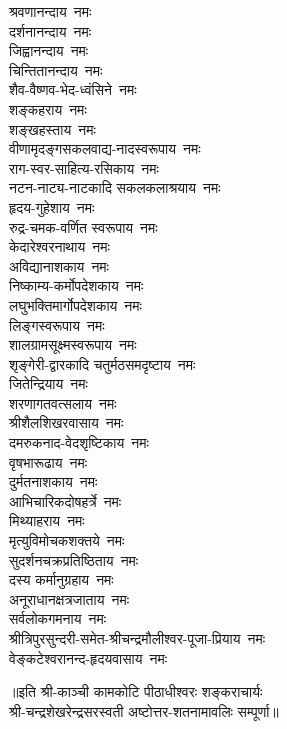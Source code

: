 \begin{flushleft}
\begin{multicols}{2}
श्रवणानन्दाय~नमः\\
दर्शनानन्दाय~नमः\\
जिह्वानन्दाय~नमः\\
चिन्तितानन्दाय~नमः\\
शैव-वैष्णव-भेद-ध्वंसिने~नमः\\
शङ्कहराय~नमः\hfill{}\\
शङ्खहस्ताय~नमः\\
वीणामृदङ्गसकलवाद्य-नादस्वरूपाय~नमः\\
राग-स्वर-साहित्य-रसिकाय~नमः\\
नटन-नाट्य-नाटकादि सकलकलाश्रयाय~नमः\\
हृदय-गुहेशाय~नमः\\
रुद्र-चमक-वर्णित स्वरूपाय~नमः\\
केदारेश्वरनाथाय~नमः\\
अविद्यानाशकाय~नमः\\
निष्काम्य-कर्मोपदेशकाय~नमः\\
लघुभक्तिमार्गोपदेशकाय~नमः\hfill{}\\
लिङ्गस्वरूपाय~नमः\\
शालग्रामसूक्ष्मस्वरूपाय~नमः\\
शृङ्गेरी-द्वारकादि चतुर्मठसमदृष्टाय~नमः\\
जितेन्द्रियाय~नमः\\
शरणागतवत्सलाय~नमः\\
श्रीशैलशिखरवासाय~नमः\\
दमरुकनाद-वेदशृष्टिकाय~नमः\\
वृषभारूढाय~नमः\\
दुर्मतनाशकाय~नमः\\
आभिचारिकदोषहर्त्रे~नमः\hfill{}\\
मिथ्याहराय~नमः\\
मृत्युविमोचकशक्तये~नमः\\
सुदर्शनचक्रप्रतिष्ठिताय~नमः\\
दस्य कर्मानुग्रहाय~नमः\\
अनूराधानक्षत्रजाताय~नमः\\
सर्वलोकगमनाय~नमः\\
श्रीत्रिपुरसुन्दरी-समेत-श्रीचन्द्रमौलीश्वर-पूजा-प्रियाय~नमः\\
वेङ्कटेश्वरानन्द-हृदयवासाय~नमः\\
\end{multicols}
\end{flushleft}
॥इति श्री-काञ्ची कामकोटि पीठाधीश्वरः शङ्कराचार्यः\\ श्री-चन्द्रशेखरेन्द्रसरस्वती अष्टोत्तर-शतनामावलिः सम्पूर्णा॥
